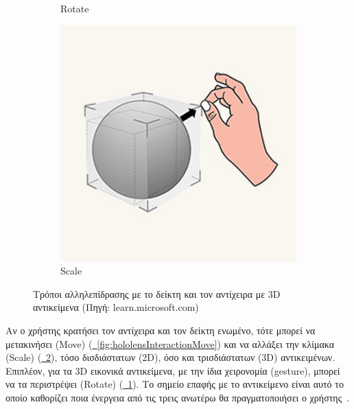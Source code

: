 \begin{enumerate}
\begin{figure}[!ht]
\begin{subfigure}{0.3\textwidth}
            \caption{Rotate}\label{fig:hololensInteractionRotate}
        \end{subfigure}%
        \begin{subfigure}{0.3\textwidth}
            \centering
            \includegraphics[width=0.9\linewidth]{images/hololens_interaction_scale.jpg}
            \caption{Scale}\label{fig:hololensInteractionScale}
        \end{subfigure}%
        \caption{Τρόποι αλληλεπίδρασης με το δείκτη και τον αντίχειρα με 3D αντικείμενα {\footnotesize (Πηγή: learn.microsoft.com)}}\label{fig:hololensInteraction3D}
    \end{figure}
    
    Αν ο χρήστης κρατήσει τον αντίχειρα και τον δείκτη ενωμένο, τότε μπορεί να μετακινήσει (Move) (\hyperref[fig:hololensInteractionMove]{\schema~\ref*{fig:hololensInteractionMove}}) και να αλλάξει την κλίμακα (Scale) (\hyperref[fig:hololensInteractionScale]{\schema~\ref*{fig:hololensInteractionScale}}), τόσο δισδιάστατων (2D), όσο και τρισδιάστατων (3D) αντικειμένων. Επιπλέον, για τα 3D εικονικά αντικείμενα, με την ίδια χειρονομία (gesture), μπορεί να τα περιστρέψει (Rotate) (\hyperref[fig:hololensInteractionRotate]{\schema~\ref*{fig:hololensInteractionRotate}}). Το σημείο επαφής με το αντικείμενο είναι αυτό το οποίο καθορίζει ποια ένεργεια από τις τρεις ανωτέρω θα πραγματοποιήσει ο χρήστης~\cite{caseymeekhof_2022_direct}.
    

\end{enumerate}
